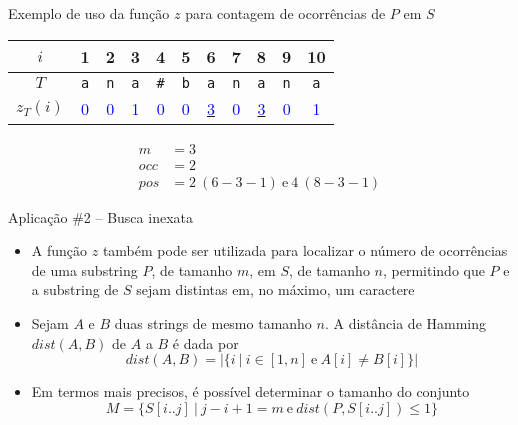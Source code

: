 \begin{frame}[fragile]{Exemplo de uso da função $z$ para contagem de ocorrências de $P$ em $S$}

    \begin{center}
    \begin{large}
    \begin{tabular}{c|cccccccccc}
        $i$ & 1 & 2 & 3 & 4 & 5 & 6 & 7 & 8 & 9 & 10 \\
        \hline
        $T$
& \texttt{\textcolor{red!80!black}{a}} 
& \texttt{\textcolor{red!80!black}{n}} 
& \texttt{\textcolor{red!80!black}{a}} 
& \texttt{\textcolor{red!80!black}{\#}} 
& \texttt{\textcolor{red!80!black}{b}} 
& \texttt{\textcolor{red!80!black}{a}} 
& \texttt{\textcolor{red!80!black}{n}} 
& \texttt{\textcolor{red!80!black}{a}} 
& \texttt{\textcolor{red!80!black}{n}} 
& \texttt{\textcolor{red!80!black}{a}} 
\\
        $z_T(i)$
& \textcolor{blue}{0} 
& \textcolor{blue}{0} 
& \textcolor{blue}{1} 
& \textcolor{blue}{0} 
& \textcolor{blue}{0} 
& \underline{\textcolor{blue}{3}}
& \textcolor{blue}{0} 
& \underline{\textcolor{blue}{3}}
& \textcolor{blue}{0} 
& \textcolor{blue}{1} 
\\
    \end{tabular}
    \end{large}
    \end{center}

    \begin{align*}
        m &= 3 \\
        occ &= 2 \\
        pos &= 2\ (6 - 3 - 1)\ \mbox{e}\ 4\ (8 - 3 - 1)
    \end{align*}
\end{frame}

\begin{frame}[fragile]{Aplicação \#2 -- Busca inexata}

    \begin{itemize}
        \item A função $z$ também pode ser utilizada para localizar o número de ocorrências
            de uma substring $P$, de tamanho $m$, em $S$, de tamanho $n$, permitindo que $P$
            e a substring de $S$ sejam distintas em, no máximo, um caractere

        \item Sejam $A$ e $B$ duas strings de mesmo tamanho $n$. A distância de Hamming $dist(A, B)$
            de $A$ a $B$ é dada por
        \[
            dist(A, B) = | \lbrace i\ | \ i\in [1,n]\ \mbox{e}\ A[i] \neq B[i]\rbrace |
        \]
       
        \item Em termos mais precisos, é possível determinar o tamanho do conjunto
        \[
            M = \lbrace S[i..j]\ | \ j - i + 1 = m\ \mbox{e}\ dist(P, S[i..j])\leq 1\rbrace
        \]
            
    \end{itemize}

\end{frame}

